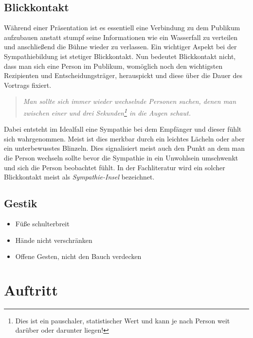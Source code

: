 \documentclass[../main.tex]{subfiles}
\begin{document}
        \subsection{Blickkontakt}
        	\label{section:Seminar:RhetorikI:SympathieInsel}
            Während einer Präsentation ist es essentiell eine Verbindung zu dem Publikum aufzubauen anstatt stumpf seine Informationen wie ein Wasserfall zu verteilen und anschließend die Bühne wieder zu verlassen. Ein wichtiger Aspekt bei der Sympathiebildung ist stetiger Blickkontakt. Nun bedeutet Blickkontakt nicht, dass man sich eine Person im Publikum, womöglich noch den wichtigsten Rezipienten und Entscheidungsträger, herauspickt und diese über die Dauer des Vortrags fixiert. 
            \begin{quote}
                \emph{Man sollte sich immer wieder wechselnde Personen suchen, denen man zwischen einer und drei Sekunden\footnote{Dies ist ein pauschaler, statistischer Wert und kann je nach Person weit darüber oder darunter liegen!} in die Augen schaut.}
            \end{quote}
            Dabei entsteht im Idealfall eine Sympathie bei dem Empfänger und dieser fühlt sich wahrgenommen. Meist ist dies merkbar durch ein leichtes Lächeln oder aber ein unterbewusstes Blinzeln. Dies signalisiert meist auch den Punkt an dem man die Person wechseln sollte bevor die Sympathie in ein Unwohlsein umschwenkt und sich die Person beobachtet fühlt. In der Fachliteratur wird ein solcher Blickkontakt meist als \emph{Sympathie-Insel} bezeichnet.
            
        \subsection{Gestik}
        	\begin{itemize}
        		\item Füße schulterbreit
        		\item Hände nicht verschränken
        		\item Offene Gesten, nicht den Bauch verdecken
        	\end{itemize}
            
            
    
    \section{Auftritt}
\end{document}
